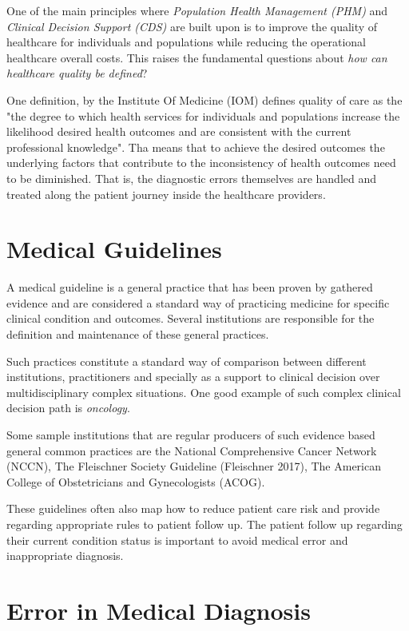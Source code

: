 \label{chap:introduction}

One of the main principles where \emph{Population Health Management (PHM)} and \emph{Clinical Decision Support (CDS)} are built upon is to improve the quality of healthcare for individuals and populations while reducing the operational healthcare overall costs. This raises the fundamental questions about \emph{how can healthcare quality be defined}?

One definition, by the Institute Of Medicine (IOM)\cite{iom2000} defines quality of care as the "the degree to which health services for individuals and populations increase the likelihood desired health outcomes and are consistent with the current professional knowledge". Tha means that to achieve the desired outcomes the underlying factors that contribute to the inconsistency of health outcomes need to be diminished. That is, the diagnostic errors themselves are handled and treated along the patient journey inside the healthcare providers.

\section{Medical Guidelines}

A medical guideline is a general practice that has been proven by gathered evidence and are considered a standard way of practicing medicine for specific clinical condition and outcomes. Several institutions are responsible for the definition and maintenance of these general practices. 

Such practices constitute a standard way of comparison between different institutions, practitioners and specially as a support to clinical decision over multidisciplinary complex situations. One good example of such complex clinical decision path is \emph{oncology}.

Some sample institutions that are regular producers of such evidence based general common practices are the National Comprehensive Cancer Network (NCCN)\cite{nccn2019}, The Fleischner Society Guideline (Fleischner 2017)\cite{fleischner2017}, The American College of Obstetricians and Gynecologists (ACOG)\cite{acog2019}.

These guidelines often also map how to reduce patient care risk and provide regarding appropriate rules to patient follow up. The patient follow up regarding their current condition status is important to avoid medical error and inappropriate diagnosis.

\section{Error in Medical Diagnosis}

